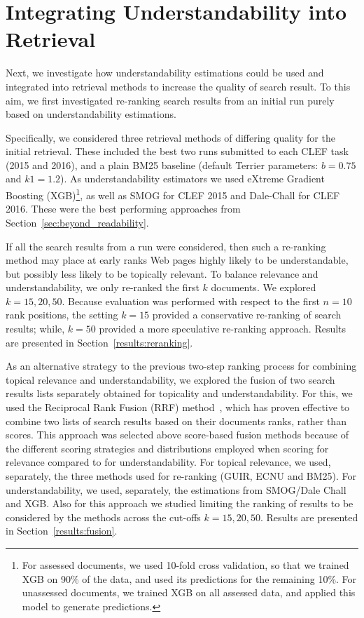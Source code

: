 \section{Integrating Understandability into Retrieval}
\label{sec:experiments}

Next, we investigate how understandability estimations could be used and integrated into retrieval methods to increase the quality of search result. To this aim, we first investigated re-ranking search results from an initial run purely based on understandability estimations. 

Specifically, we considered three retrieval methods of differing quality for the initial retrieval. These included the best two runs submitted to each CLEF task (2015 and 2016), and a plain BM25 baseline (default Terrier parameters: $b=0.75$ and $k1=1.2$). As understandability estimators we used  eXtreme Gradient Boosting (XGB)\footnote{For assessed documents, we used 10-fold cross validation, so that we trained XGB on 90\% of the data, and used its predictions for the remaining 10\%. For unassessed documents, we trained XGB on all assessed data, and applied this model to generate predictions.}, as well as SMOG for CLEF 2015 and Dale-Chall for CLEF 2016. These were the best performing approaches from Section~\ref{sec:beyond_readability}.

If all the search results from a run were considered, then such a re-ranking method may place at early ranks Web pages highly likely to be understandable, but possibly less likely to be topically relevant. To balance relevance and understandability, we only re-ranked the first $k$ documents. We explored $k = 15, 20, 50$. Because evaluation was performed with respect to the first $n=10$ rank positions, the setting $k=15$ provided a conservative re-ranking of search results; while, $k=50$ provided a more speculative re-ranking approach. Results are presented in Section~\ref{results:reranking}.

As an alternative strategy to the previous two-step ranking process for combining topical relevance and understandability, we explored the fusion of two search results lists separately obtained for topicality and understandability.  For this, we used the Reciprocal Rank Fusion (RRF) method~\cite{cormack09}, which has proven effective to combine two lists of search results based on their documents ranks, rather than scores. This approach was selected above score-based fusion methods because of the different scoring strategies and distributions employed when scoring for relevance compared to for understandability. For topical relevance, we used, separately, the three methods used for re-ranking (GUIR, ECNU and BM25). For understandability, we used, separately, the estimations from SMOG/Dale Chall and XGB. Also for this approach we studied limiting the ranking of results to be considered by the methods across the cut-offs $k=15, 20, 50$. Results are presented in Section~\ref{results:fusion}.

